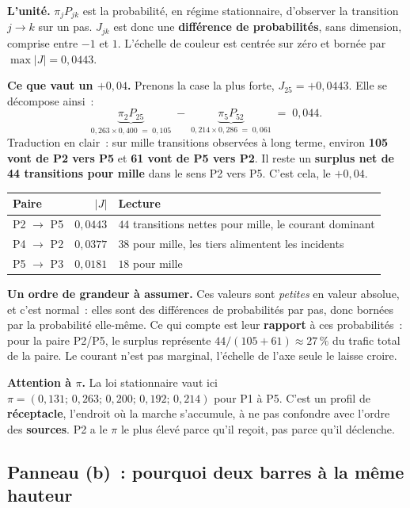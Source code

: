 \documentclass[11pt,a4paper]{article}
\begin{document}
\textbf{L'unité.} $\pi_j P_{jk}$ est la probabilité, en régime stationnaire, d'observer la
transition $j\to k$ sur un pas. $J_{jk}$ est donc une \textbf{différence de probabilités},
sans dimension, comprise entre $-1$ et $1$. L'échelle de couleur est centrée sur zéro et
bornée par $\max|J|=0{,}0443$.

\textbf{Ce que vaut un $+0{,}04$.} Prenons la case la plus forte, $J_{25}=+0{,}0443$. Elle
se décompose ainsi~:
\[
  \underbrace{\pi_2 P_{25}}_{0{,}263\times0{,}400\;=\;0{,}105}
  \;-\;
  \underbrace{\pi_5 P_{52}}_{0{,}214\times0{,}286\;=\;0{,}061}
  \;=\;0{,}044 .
\]
Traduction en clair~: sur mille transitions observées à long terme, environ \textbf{105
vont de P2 vers P5} et \textbf{61 vont de P5 vers P2}. Il reste un \textbf{surplus net de
44 transitions pour mille} dans le sens P2 vers P5. C'est cela, le $+0{,}04$.

\medskip
\begin{center}
\small
\begin{tabular}{@{}l r l@{}}
\toprule
\textbf{Paire} & \textbf{$|J|$} & \textbf{Lecture} \\
\midrule
P2 $\to$ P5 & $0{,}0443$ & $44$ transitions nettes pour mille, le courant dominant \\
P4 $\to$ P2 & $0{,}0377$ & $38$ pour mille, les tiers alimentent les incidents \\
P5 $\to$ P3 & $0{,}0181$ & $18$ pour mille \\
\bottomrule
\end{tabular}
\end{center}

\medskip
\textbf{Un ordre de grandeur à assumer.} Ces valeurs sont \emph{petites} en valeur absolue,
et c'est normal~: elles sont des différences de probabilités par pas, donc bornées par la
probabilité elle-même. Ce qui compte est leur \textbf{rapport} à ces probabilités~: pour la
paire P2/P5, le surplus représente $44/(105+61)\approx 27\,\%$ du trafic total de la paire.
Le courant n'est pas marginal, l'échelle de l'axe seule le laisse croire.

\textbf{Attention à $\pi$.} La loi stationnaire vaut ici $\pi=(0{,}131;\,0{,}263;\,0{,}200;
\,0{,}192;\,0{,}214)$ pour P1 à P5. C'est un profil de \textbf{réceptacle}, l'endroit où la
marche s'accumule, à ne pas confondre avec l'ordre des \textbf{sources}. P2 a le $\pi$ le
plus élevé parce qu'il reçoit, pas parce qu'il déclenche.

\subsection*{Panneau (b)~: pourquoi deux barres à la même hauteur}
\end{document}
